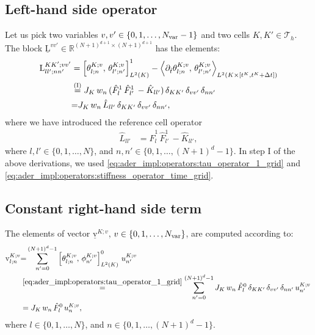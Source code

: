 \documentclass{scrreprt}
\theoremstyle{definition}
\theoremstyle{nonumberplain}
\newcommand{\laVec}[1]{\underline{\mathrm{#1}}}
\newcommand{\laVecel}[1]{\mathrm{#1}}
\newcommand{\laMat}[1]{\underline{\mathrm{#1}}}
\newcommand{\laMatel}[1]{\mathrm{#1}}
\newcommand{\tria}{\mathcal{T}_h}
\newcommand{\cell}{K}
\newcommand{\detJ}{J_\cell}
\begin{document}
\subsection{Left-hand side operator}
Let us pick two variables $v,v'\in\{0,1,\ldots,N_\textup{var}-1\}$
and two cells $\cell,\cell'\in\tria$.
The block
$\laMat{L}^{vv'}\in\mathbb{R}^{(N+1)^{d+1}\times(N+1)^{d+1}}$ has the elements:
\begin{align}
\laMatel{L}^{\cell\cell';vv'}_{ll';nn'}
&=
\left[\theta^{\cell;v}_{l;n},\,\theta^{\cell;v}_{l';n'}\right]^{1}_{L^2(\cell)}
-
\left\langle
\partial_{\hat{t}}\theta^{\cell;v}_{l;n},\,
\theta^{\cell;v}_{l';n'}
\right\rangle
_{L^2(\cell\times[t^\cell,t^\cell+\Delta t])}
\notag
\\
&
\overset{\textup{(I)}}
{=}
\detJ\,
w_{n}\,
(\hat{F}^1_{l}\,
\hat{F}^1_{l'}\,
-\hat{K}_{ll'})\,
\delta_{\cell\cell'}\,\delta_{vv'}\,
\delta_{n n'}
\notag
\\
&{=}
\detJ\,
w_{n}\,
\hat{L}_{ll'}\,
\delta_{\cell\cell'}\,\delta_{vv'}\,
\delta_{n n'},
\end{align}
where we have introduced the reference cell operator
\begin{align}
\hat{L}_{ll'}
&=
\hat{F}^1_{l}\,
\hat{F}^1_{l'}\,
-\hat{K}_{ll'},
\end{align}
where $l,l'\in\{0,1,\ldots,N\}$, and
$n,n'\in\{0,1,\ldots,(N+1)^{d}-1\}$.
In step I of the above derivations, we
used
\eqref{eq:ader_impl:operators:tau_operator_1_grid}
and
\eqref{eq:ader_impl:operators:stiffness_operator_time_grid}.
\subsection{Constant right-hand side term}
The elements of vector
$\laVec{v}^{\cell;v}$, $v\in\{0,1,\ldots,N_\textup{var}\}$, are computed
according to:
\begin{align*}
\laVecel{v}^{\cell;v}_{l;n}
&{=}
\sum_{n'=0}^{(N+1)^{d}-1}
\left[\theta^{\cell;v}_{l;n},\,\phi^{\cell;v}_{n'}\right]^{0}_{L^2(\cell)}
\,
u^{\cell;v}_{n'}
\\
&\overset{\eqref{eq:ader_impl:operators:tau_operator_1_grid}}=
\sum_{n'=0}^{(N+1)^{d}-1}
\detJ\,
w_{n}\,
\hat{F}^0_l\,
\delta_{\cell\cell'}\,\delta_{vv'}\,
\delta_{n n'}
\,
u^{\cell;v}_{n'}\,
\\
&=
\detJ\,
w_{n}\,
\hat{F}^0_l\,
u^{\cell;v}_{n},
\end{align*}
where $l\in\{0,1,\ldots,N\}$, and
$n\in\{0,1,\ldots,(N+1)^{d}-1\}$.
\end{document}
